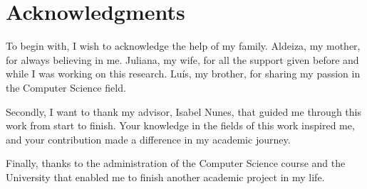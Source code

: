 
\chapter*{Acknowledgments}

To begin with, I wish to acknowledge the help of my family. Aldeiza, my mother, for always believing in me. Juliana, my wife, for all the support given before and while I was working on this research. Luís, my brother, for sharing my passion in the Computer Science field.

Secondly, I want to thank my advisor, Isabel Nunes, that guided me through this work from start to finish. Your knowledge in the fields of this work inspired me, and your contribution made a difference in my academic journey.

Finally, thanks to the administration of the Computer Science course and the University that enabled me to finish another academic project in my life.